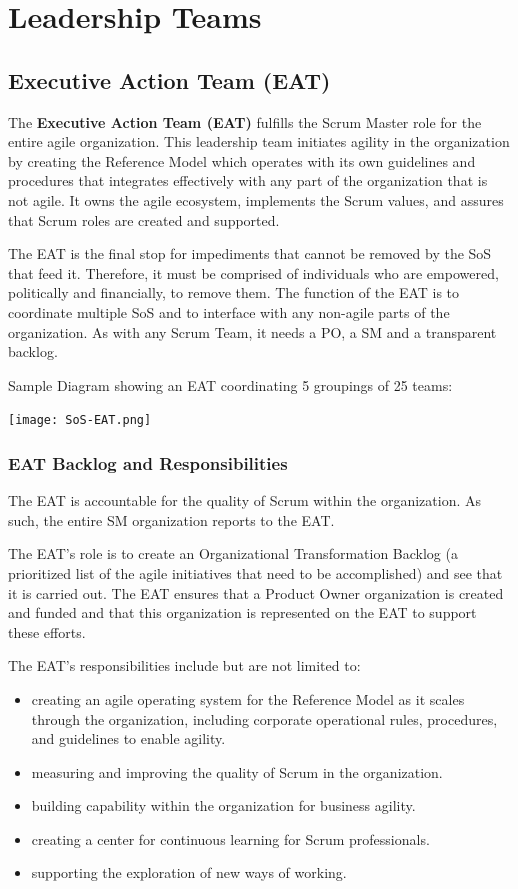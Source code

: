 \documentclass[12pt,a4paper,parskip=full]{scrartcl}
\begin{document}
\section{Leadership Teams}

\subsection{Executive Action Team (EAT)}

The \textbf{Executive Action Team (EAT)} fulfills the Scrum Master role for the entire agile organization. This leadership team initiates agility in the organization by creating the Reference Model which operates with its own guidelines and procedures that integrates effectively with any part of the organization that is not agile. It owns the agile ecosystem, implements the Scrum values, and assures that Scrum roles are created and supported.

The EAT is the final stop for impediments that cannot be removed by the SoS that feed it. Therefore, it must be comprised of individuals who are empowered, politically and financially, to remove them. The function of the EAT is to coordinate multiple SoS and to interface with any non-agile parts of the organization. As with any Scrum Team, it needs a PO, a SM and a transparent backlog.

Sample Diagram showing an EAT coordinating 5 groupings of 25 teams:

\texttt{[image: SoS-EAT.png]}

\subsubsection{EAT Backlog and Responsibilities}

The EAT is accountable for the quality of Scrum within the organization. As such, the entire SM organization reports to the EAT.

The EAT's role is to create an Organizational Transformation Backlog (a prioritized list of the agile initiatives that need to be accomplished) and see that it is carried out. The EAT ensures that a Product Owner organization is created and funded and that this organization is represented on the EAT to support these efforts. 

The EAT's responsibilities include but are not limited to:

\begin{itemize}
	\item creating an agile operating system for the Reference Model as it scales through the organization, including corporate operational rules, procedures, and guidelines to enable agility.
	\item measuring and improving the quality of Scrum in the organization.
	\item building capability within the organization for business agility.
	\item creating a center for continuous learning for Scrum professionals.
	\item supporting the exploration of new ways of working.
\end{itemize}
\end{document}
